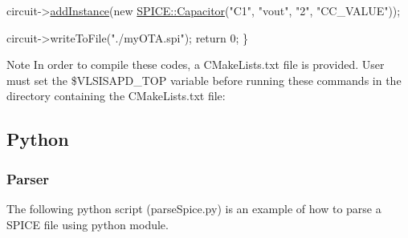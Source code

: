 \begin{DoxyCodeInclude}
    circuit->\hyperlink{class_s_p_i_c_e_1_1_circuit_a7bb4a4532643568ab1ac2c229185a88e}{addInstance}(\textcolor{keyword}{new} \hyperlink{class_s_p_i_c_e_1_1_capacitor}{SPICE::Capacitor}(\textcolor{stringliteral}{"C1"}, \textcolor{stringliteral}{"vout"}, \textcolor{stringliteral}{"2"}, \textcolor{stringliteral}{"CC\_VALUE"}));

    circuit->writeToFile(\textcolor{stringliteral}{"./myOTA.spi"});
    \textcolor{keywordflow}{return} 0;
\}

\end{DoxyCodeInclude}


\begin{DoxyNote}{Note}
In order to compile these codes, a C\-Make\-Lists.\-txt file is provided. User must set the \$\-V\-L\-S\-I\-S\-A\-P\-D\-\_\-\-T\-O\-P variable before running these commands in the directory containing the C\-Make\-Lists.\-txt file\-: 
\begin{DoxyCode}
\end{DoxyCode}

\end{DoxyNote}
\hypertarget{spice_spicePython}{}\subsection{Python}\label{spice_spicePython}
\hypertarget{spice_spiceParsePython}{}\subsubsection{Parser}\label{spice_spiceParsePython}
The following python script ({\ttfamily parse\-Spice.\-py}) is an example of how to parse a S\-P\-I\-C\-E file using python module. 
